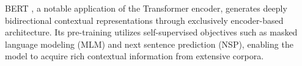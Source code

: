 \documentclass[runningheads]{llncs}
\begin{document}
BERT \cite{devlin2018bert}, a notable application of the Transformer
encoder, generates deeply bidirectional contextual representations
through exclusively encoder-based architecture. Its pre-training
utilizes self-supervised objectives such as masked language modeling
(MLM) and next sentence prediction (NSP), enabling the model to
acquire rich contextual information from extensive corpora.




\end{document}
